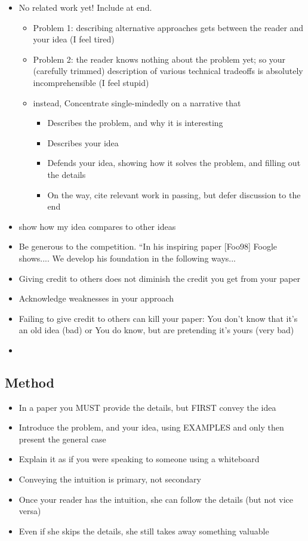 \begin{itemize}
\item No related work yet! Include at end.
\begin{itemize}
    \item Problem 1: describing alternative approaches gets between the reader and your idea (I feel tired)
    \item Problem 2: the reader knows nothing
    about the problem yet; so your (carefully
    trimmed) description of various technical
    tradeoffs is absolutely incomprehensible (I feel stupid)
    \item instead, Concentrate single-mindedly on a narrative that
    \begin{itemize}
        \item Describes the problem, and why it is interesting
        \item Describes your idea
        \item Defends your idea, showing how it solves the problem,
and filling out the details
        \item On the way, cite relevant work in passing, but defer
discussion to the end
    \end{itemize}
\end{itemize}

\item show how my idea compares to other ideas
\item Be generous to the competition. “In his inspiring paper
[Foo98] Foogle shows.... We develop his foundation in the
following ways...
\item Giving credit to others does not diminish
the credit you get from your paper
\item Acknowledge weaknesses in your approach
\item Failing to give credit to others can kill
your paper: You don't know that it's an old idea (bad) or You do know, but are pretending it's yours (very bad)

\item 

\end{itemize}

\subsection{Method}
\begin{itemize}
\item In a paper you MUST provide the details,
but FIRST convey the idea
\item Introduce the problem, and your idea, using
EXAMPLES and only then present the general case
\item Explain it as if you were speaking to someone using
a whiteboard
\item Conveying the intuition is primary, not secondary
\item Once your reader has the intuition, she can follow
the details (but not vice versa)
\item Even if she skips the details, she still takes away
something valuable
\end{itemize}

